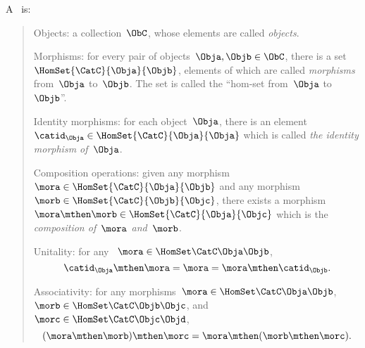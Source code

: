 \begin{ctdefinition}[Category]
  \label{def:categorymain}
  A \emph{}~\CatC is:
\begin{quote}
    \constit
  \begin{compactenum}
    \item Objects: a collection\footnotemark~$\ObC$, whose elements are called \emph{objects}.
    \item Morphisms: for every pair of objects~$\Obja,\Objb\in \ObC$, there is a set~$\HomSet{\CatC}{\Obja}{\Objb}$, elements of which are called
    \emph{morphisms} from~$\Obja$ to~$\Objb$. The set is called the ``hom-set from~$\Obja$ to~$\Objb$''.
    \item Identity morphisms: for each object~$\Obja$, there is
    an element~$\catid_{\Obja} \in \HomSet{\CatC}{\Obja}{\Obja}$ which is called \emph{the identity
    morphism of~$\Obja$}.
    \item Composition operations: given any morphism~${\mora} \in  \HomSet{\CatC}{\Obja}{\Objb}$ and any morphism~${\morb} \in \HomSet{\CatC}{\Objb}{\Objc}$, there exists a morphism~$\mora \mthen \morb\in \HomSet{\CatC}{\Obja}{\Objc}$ which is the \emph{composition of~$\mora$ and~$\morb$}.
  \end{compactenum}
 \condit
  \begin{compactenum}
    \item Unitality: for any ~$\mora\in \HomSet\CatC\Obja\Objb$,
    \begin{equation}
      \catid_\Obja \mthen \mora= \mora = \mora \mthen \catid_\Objb.
    \end{equation}
    \item Associativity: for any morphisms~$\mora\in \HomSet\CatC\Obja\Objb$,~$\morb\in \HomSet\CatC\Objb\Objc$, and~$\morc\in \HomSet\CatC\Objc\Objd$,
    \begin{equation}
    (\mora\mthen \morb)
      \mthen \morc= \mora \mthen (\morb \mthen \morc).
    \end{equation}
  \end{compactenum}
  \end{quote}
\end{ctdefinition}



